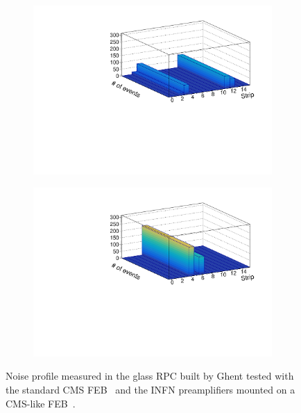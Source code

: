 	\begin{figure}[H]
		\begin{subfigure}{.5\linewidth}
		    \centering
			\includegraphics[width=\linewidth]{fig/chapt6/Noise-Profile-gRPC-CMS-FEB.pdf}
			\caption{\label{fig:gRPC-noise:A}}
		\end{subfigure}
		\begin{subfigure}{.5\linewidth}
		    \centering
			\includegraphics[width = \linewidth]{fig/chapt6/Noise-Profile-gRPC-INFN.pdf}
			\caption{\label{fig:gRPC-noise:B}}
		\end{subfigure}
		\caption{\label{fig:gRPC-noise} Noise profile measured in the glass RPC built by Ghent tested with the standard CMS FEB~ and the INFN preamplifiers mounted on a CMS-like FEB~.}
	\end{figure}
    
